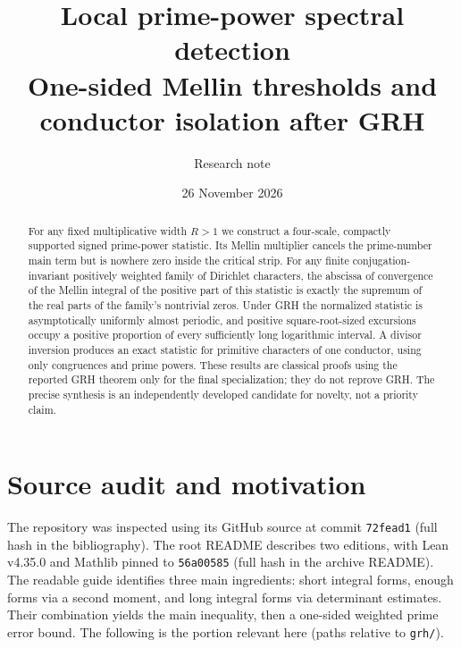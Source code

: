 \documentclass[11pt]{article}
\title{Local prime-power spectral detection\\\large One-sided Mellin thresholds and conductor isolation after GRH}
\author{Research note}
\date{26 November 2026}
\theoremstyle{remark}\newtheorem{remark}[theorem]{Remark}
\begin{document}
\maketitle
\begin{abstract}
For any fixed multiplicative width $R>1$ we construct a four-scale, compactly supported signed prime-power statistic. Its Mellin multiplier cancels the prime-number main term but is nowhere zero inside the critical strip. For any finite conjugation-invariant positively weighted family of Dirichlet characters, the abscissa of convergence of the Mellin integral of the positive part of this statistic is exactly the supremum of the real parts of the family's nontrivial zeros. Under GRH the normalized statistic is asymptotically uniformly almost periodic, and positive square-root-sized excursions occupy a positive proportion of every sufficiently long logarithmic interval. A divisor inversion produces an exact statistic for primitive characters of one conductor, using only congruences and prime powers. These results are classical proofs using the reported GRH theorem only for the final specialization; they do not reprove GRH. The precise synthesis is an independently developed candidate for novelty, not a priority claim.
\end{abstract}

\section{Source audit and motivation}
The repository \cite{sernau} was inspected using its GitHub source at commit
\texttt{72fead1} (full hash in the bibliography). The root README describes two editions, with Lean v4.35.0 and Mathlib pinned to \texttt{56a00585} (full hash in the archive README). The readable guide identifies three main ingredients: short integral forms, enough forms via a second moment, and long integral forms via determinant estimates. Their combination yields the main inequality, then a one-sided weighted prime error bound. The following is the portion relevant here (paths relative to \texttt{grh/}).
\end{document}
